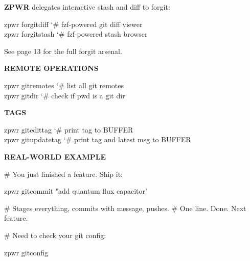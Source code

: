 \documentclass[11pt,a4paper,twoside]{book}
\begin{document}
\textbf{ZPWR} delegates interactive stash and diff to forgit:

\begin{codebox}
\color{neongreen}zpwr forgitdiff        {\char`\#} fzf-powered git diff viewer\\
\color{neongreen}zpwr forgitstash       {\char`\#} fzf-powered stash browser\\
\end{codebox}

See page 13 for the full forgit arsenal.


\vspace{12pt}
{\bfseries\color{neonyellow} REMOTE OPERATIONS}\vspace{4pt}

\begin{codebox}
\color{neongreen}zpwr gitremotes        {\char`\#} list all git remotes\\
\color{neongreen}zpwr gitdir            {\char`\#} check if pwd is a git dir\\
\end{codebox}


\vspace{12pt}
{\bfseries\color{neonyellow} TAGS}\vspace{4pt}

\begin{codebox}
\color{neongreen}zpwr gitedittag        {\char`\#} print tag to BUFFER\\
\color{neongreen}zpwr gitupdatetag      {\char`\#} print tag and latest msg to BUFFER\\
\end{codebox}


\vspace{12pt}
{\bfseries\color{neonyellow} REAL-WORLD EXAMPLE}\vspace{4pt}

\# You just finished a feature. Ship it:

\begin{codebox}
\color{neongreen}zpwr gitcommit "add quantum flux capacitor"\\
\end{codebox}

\# Stages everything, commits with message, pushes. \# One line. Done. Next feature.

\# Need to check your git config:

\begin{codebox}
\color{neongreen}zpwr gitconfig\\
\end{codebox}
\end{document}
